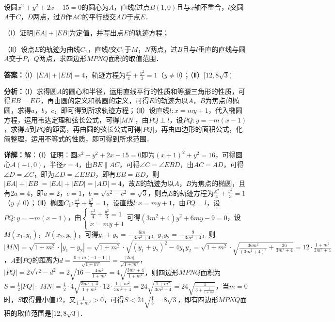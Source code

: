 \begin{question}[points=12]
设圆$x^2+y^2+2x-15=0$的圆心为$A$，直线$l$过点$B(1,0)$且与$x$轴不重合，$l$交圆$A$于$C$，$D$两点，过$B$作$AC$的平行线交$AD$于点$E$．

（Ⅰ）证明$|EA|+|EB|$为定值，并写出点$E$的轨迹方程；

（Ⅱ）设点$E$的轨迹为曲线$C_1$，直线$l$交$C_1$于$M$，$N$两点，过$B$且与$l$垂直的直线与圆$A$交于$P$，$Q$两点，求四边形$MPNQ$面积的取值范围．
\begin{solution}
\textbf{答案：}（Ⅰ）$|EA|+|EB|=4$，轨迹方程为$\frac{x^2}{4}+\frac{y^2}{3}=1$（$y\neq0$）；（Ⅱ）$[12,8\sqrt{3})$

\textbf{分析：}（Ⅰ）求得圆$A$的圆心和半径，运用直线平行的性质和等腰三角形的性质，可得$EB=ED$，再由圆的定义和椭圆的定义，可得$E$的轨迹为以$A$，$B$为焦点的椭圆，求得$a$，$b$，$c$，即可得到所求轨迹方程；（Ⅱ）设直线$l:x=my+1$，代入椭圆方程，运用韦达定理和弦长公式，可得$|MN|$，由$PQ\perp l$，设$PQ:y=-m(x-1)$，求得$A$到$PQ$的距离，再由圆的弦长公式可得$|PQ|$，再由四边形的面积公式，化简整理，运用不等式的性质，即可得到所求范围．

\textbf{详解：}解：（Ⅰ）证明：圆$x^2+y^2+2x-15=0$即为$(x+1)^2+y^2=16$，可得圆心$A(-1,0)$，半径$r=4$，由$BE\parallel AC$，可得$\angle C=\angle EBD$，由$AC=AD$，可得$\angle D=\angle C$，即为$\angle D=\angle EBD$，即有$EB=ED$，则$|EA|+|EB|=|EA|+|ED|=|AD|=4$，故$E$的轨迹为以$A$，$B$为焦点的椭圆，且有$2a=4$，即$a=2$，$c=1$，$b=\sqrt{a^2-c^2}=\sqrt{3}$，则点$E$的轨迹方程为$\frac{x^2}{4}+\frac{y^2}{3}=1$（$y\neq0$）；（Ⅱ）椭圆$C_1:\frac{x^2}{4}+\frac{y^2}{3}=1$，设直线$l:x=my+1$，由$PQ\perp l$，设$PQ:y=-m(x-1)$，由$\begin{cases}\frac{x^2}{4}+\frac{y^2}{3}=1\\x=my+1\end{cases}$可得$(3m^2+4)y^2+6my-9=0$，设$M(x_1,y_1)$，$N(x_2,y_2)$，可得$y_1+y_2=-\frac{6m}{3m^2+4}$，$y_1y_2=-\frac{9}{3m^2+4}$，则$|MN|=\sqrt{1+m^2}\cdot|y_1-y_2|=\sqrt{1+m^2}\cdot\sqrt{(y_1+y_2)^2-4y_1y_2}=\sqrt{1+m^2}\cdot\sqrt{\frac{36m^2}{(3m^2+4)^2}+\frac{36}{3m^2+4}}=12\cdot\frac{1+m^2}{3m^2+4}$，$A$到$PQ$的距离为$d=\frac{|0+m(-1-1)|}{\sqrt{1+m^2}}=\frac{|2m|}{\sqrt{1+m^2}}$，$|PQ|=2\sqrt{r^2-d^2}=2\sqrt{16-\frac{4m^2}{1+m^2}}=4\sqrt{\frac{3m^2+4}{1+m^2}}$，则四边形$MPNQ$面积为$S=\frac{1}{2}|PQ|\cdot|MN|=\frac{1}{2}\cdot4\sqrt{\frac{3m^2+4}{1+m^2}}\cdot12\cdot\frac{1+m^2}{3m^2+4}=24\sqrt{\frac{1+m^2}{3m^2+4}}=24\sqrt{\frac{1}{3+\frac{1}{1+m^2}}}$，当$m=0$时，$S$取得最小值$12$，又$\frac{1}{1+m^2}>0$，可得$S<24\sqrt{\frac{1}{3}}=8\sqrt{3}$，即有四边形$MPNQ$面积的取值范围是$[12,8\sqrt{3})$．
\end{solution}
\end{question}

